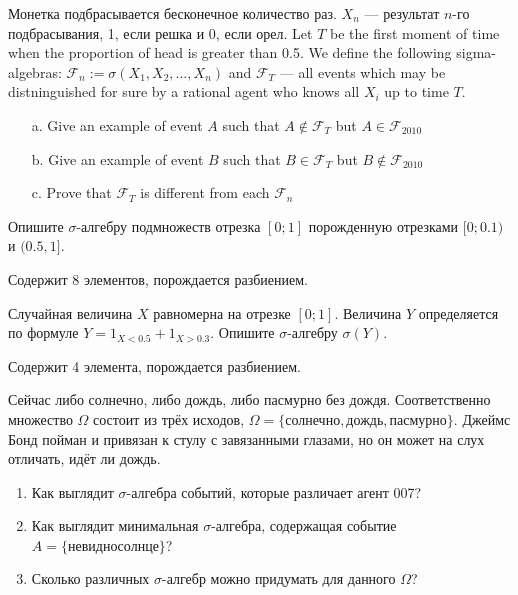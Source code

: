 \begin{problem}
Монетка подбрасывается бесконечное количество раз. $ X_{n} $ --- результат $ n $-го подбрасывания, 1, если решка и 0, если орел. Let $T$ be the first moment of time when the proportion of head is greater than 0.5. We define the following sigma-algebras: $ \mathcal{F}_{n}:=\sigma(X_{1},X_{2},\ldots,X_{n})$ and $ \mathcal{F}_{T} $ --- all events which may be distninguished for sure by a rational agent who knows all $ X_{i} $ up to time $ T $. 
\begin{itemize}
\item[a.] Give an example of event $A$ such that $ A\notin \mathcal{F}_{T} $ but $ A\in \mathcal{F}_{2010} $
\item[b.] Give an example of event $B$ such that $ B\in \mathcal{F}_{T} $ but $ B\notin \mathcal{F}_{2010} $
\item[c.] Prove that $ \mathcal{F}_{T} $ is different from each $ \mathcal{F}_{n} $
\end{itemize}

\end{problem} 
\begin{solution} 

\end{solution}

\begin{problem}
Опишите $\sigma$-алгебру подмножеств отрезка $[0;1]$ порожденную отрезками $[0;0.1)$ и $(0.5,1]$.
\end{problem} 
\begin{solution} 
Содержит 8 элементов, порождается разбиением.
\end{solution}

\begin{problem}
Случайная величина $X$ равномерна на отрезке $[0;1]$. Величина $Y$ определяется по формуле $Y=1_{X<0.5}+1_{X>0.3}$. Опишите $\sigma$-алгебру $\sigma(Y)$.
\end{problem} 
\begin{solution} 
Содержит 4 элемента, порождается разбиением.
\end{solution}


\begin{problem}
Сейчас либо солнечно, либо дождь, либо пасмурно без дождя. Соответственно множество $\Omega$ состоит из трёх исходов, $\Omega=\{\text{солнечно},\text{дождь},\text{пасмурно}\}$. Джеймс Бонд пойман и привязан к стулу с завязанными глазами, но он может на слух отличать, идёт ли дождь. 
\begin{enumerate}
\item Как выглядит $\sigma$-алгебра событий, которые различает агент 007?
\item Как выглядит минимальная $\sigma$-алгебра, содержащая событие $A=\{не видно солнце\}$?
\item Сколько различных $\sigma$-алгебр можно придумать для данного $\Omega$?
\end{enumerate}
\end{problem}


